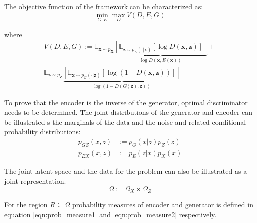 The objective function of the framework can be characterized as:
\begin{equation}
    \min _{G, E} \max _{D} V(D, E, G)
\end{equation}
 
where
\begin{multline}
    \label{eqn:bigan_v}
V(D, E, G) :=\mathbb{E}_{\mathbf{x} \sim p_{\mathbf{X}}}  \underbrace{\left[ \mathbb{E}_{\mathbf{z} \sim p_{E}(\cdot | \mathbf{x})}[\log D(\mathbf{x}, \mathbf{z})] \right]}_{\log D(\mathbf{x}, E(\mathbf{x}))} + \\ \mathbb{E}_{\mathbf{z} \sim p_{\mathbf{Z}}} \underbrace{  \left[ \mathbb{E}_{\mathbf{x} \sim p_{G}(\cdot | \mathbf{z})}[\log (1-D(\mathbf{x}, \mathbf{z}))] \right]}_{\log (1-D(G(\mathbf{z}), \mathbf{z}))}
\end{multline}

To prove that the encoder is the inverse of the generator, optimal discriminator needs to be
determined.\cite{Donahue2017AdversarialFL} The joint distributions of the generator and encoder can
be illustrated s the marginals of the data and the noise and related conditional probability
distributions:
\begin{align}
    \label{eqn:bigan_gz}
    p_{GZ} (x, z ) &:= p_G(x | z) p_{Z} (z) \\[5pt] 
    \label{eqn:bigan_ex}
    p_{EX} (x, z ) &:= p_E(z | x) p_{X} (x) 
\end{align}

The joint latent space and the data for the problem can also be illustrated as a joint
representation.
$$
\Omega := \Omega_{X} \times \Omega_{Z}
$$

 For the region $R \subseteq \Omega$ probability
 measures\cite{RePEc:eee:csdana:v:20:y:1995:i:6:p:703-702} of encoder and generator is defined in
 equation \ref{eqn:prob_measure1} and \ref{eqn:prob_measure2} respectively.\cite{Donahue2017AdversarialFL}


